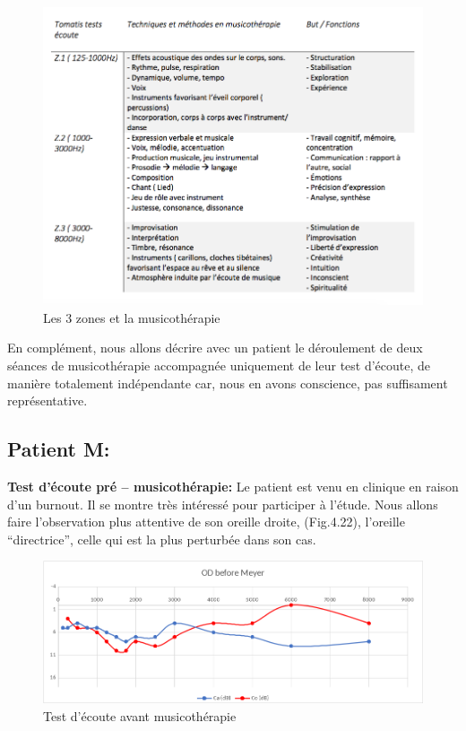 \begin{figure}[tbh]
	\centering
	\includegraphics[width=1\linewidth]{images/testtechnmethbut}
	\caption[Zones du test avec la musicothérapie]{Les 3
          zones et la musicothérapie}

	\label{testbutetfonction}
\end{figure}



En complément, nous allons décrire avec un patient le déroulement de deux séances de
musicothérapie accompagnée uniquement de leur test d'écoute, de
manière totalement indépendante car, nous en avons conscience, pas
suffisament représentative.

\subsection{Patient M:}

\textbf{ Test d'écoute pré -- musicothérapie:}
 	Le patient est venu en clinique en raison d'un burnout. Il se montre très
        intéressé pour participer à l'étude. Nous allons faire
        l'observation plus attentive de
        son oreille droite, (Fig.4.22), l'oreille ``directrice'',
        celle qui est la plus perturbée dans son cas.


 	\begin{figure}[tbh]
 		\centering
 		\includegraphics[width=0.7\linewidth]{images/clinique/od_before_meyer.png}
 		\caption{Test d'écoute avant musicothérapie}
 		\label{fig:odbeforemeyer}
 	\end{figure}


